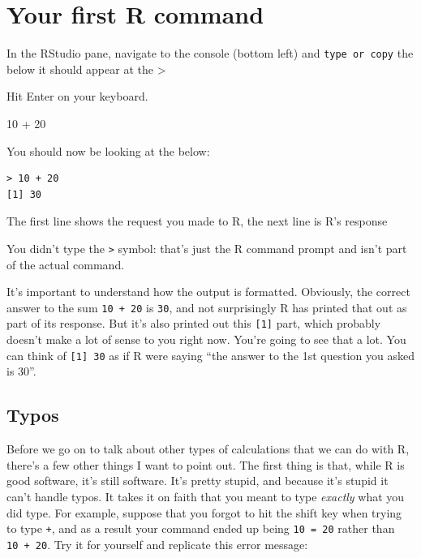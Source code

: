 \documentclass[
]{book}
\newenvironment{Shaded}{\begin{snugshade}}{\end{snugshade}}
\newcommand{\DecValTok}[1]{\textcolor[rgb]{0.00,0.00,0.81}{#1}}
\newcommand{\SpecialCharTok}[1]{\textcolor[rgb]{0.00,0.00,0.00}{#1}}
\begin{document}
\hypertarget{your-first-r-command}{%
\section{Your first R command}\label{your-first-r-command}}

In the RStudio pane, navigate to the console (bottom left) and \texttt{type\ or\ copy} the below it should appear at the \textgreater{}

Hit Enter on your keyboard.

\begin{Shaded}
\begin{Highlighting}[]
\DecValTok{10} \SpecialCharTok{+} \DecValTok{20}
\end{Highlighting}
\end{Shaded}

You should now be looking at the below:

\begin{verbatim}
> 10 + 20
[1] 30
\end{verbatim}

The first line shows the request you made to R, the next line is R's response

You didn't type the \texttt{\textgreater{}} symbol: that's just the R command prompt and isn't part of the actual command.

It's important to understand how the output is formatted. Obviously, the correct answer to the sum \texttt{10\ +\ 20} is \texttt{30}, and not surprisingly R has printed that out as part of its response. But it's also printed out this \texttt{{[}1{]}} part, which probably doesn't make a lot of sense to you right now. You're going to see that a lot. You can think of \texttt{{[}1{]}\ 30} as if R were saying ``the answer to the 1st question you asked is 30''.

\hypertarget{typos}{%
\subsection{Typos}\label{typos}}

Before we go on to talk about other types of calculations that we can do with R, there's a few other things I want to point out. The first thing is that, while R is good software, it's still software. It's pretty stupid, and because it's stupid it can't handle typos. It takes it on faith that you meant to type \emph{exactly} what you did type. For example, suppose that you forgot to hit the shift key when trying to type \texttt{+}, and as a result your command ended up being \texttt{10\ =\ 20} rather than \texttt{10\ +\ 20}. Try it for yourself and replicate this error message:
\end{document}
